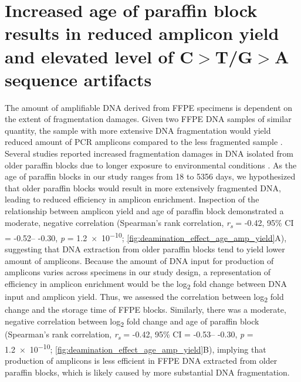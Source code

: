 \newpage
\section{Increased age of paraffin block results in reduced amplicon yield and elevated level of C$>$T/G$>$A sequence artifacts}
\label{sec:IncreasedageofparaffinblockresultsinpoorerampliconyieldandelevatedeventsofC$>$T/G$>$Asequenceartifacts}

The amount of amplifiable DNA derived from FFPE specimens is dependent on the extent of fragmentation damages. Given two FFPE DNA samples of similar quantity, the sample with more extensive DNA fragmentation would yield reduced amount of PCR amplicons compared to the less fragmented sample \cite{Didelot2013, Wong2014}. Several studies reported increased fragmentation damages in DNA isolated from older paraffin blocks due to longer exposure to environmental conditions \cite{Bass2014, Carrick2015, Ludyga2012, Seiler2016}. As the age of paraffin blocks in our study ranges from 18 to 5356 days, we hypothesized that older paraffin blocks would result in more extensively fragmented DNA, leading to reduced efficiency in amplicon enrichment. Inspection of the relationship between amplicon yield and age of paraffin block demonstrated a moderate, negative correlation (Spearman's rank correlation, \textit{r\textsubscript{s}} = -0.42, 95\% CI = -0.52-- -0.30, \textit{p} = \num{1.2e-10}; \autoref{fig:deamination_effect_age_amp_yield}A), suggesting that DNA extraction from older paraffin blocks tend to yield lower amount of amplicons. Because the amount of DNA input for production of amplicons varies across specimens in our study design, a representation of efficiency in amplicon enrichment would be the log\textsubscript{2} fold change between DNA input and amplicon yield. Thus, we assessed the correlation between log\textsubscript{2} fold change and the storage time of FFPE blocks. Similarly, there was a moderate, negative correlation between log\textsubscript{2} fold change and age of paraffin block (Spearman's rank correlation, \textit{r\textsubscript{s}} = -0.42, 95\% CI = -0.53-- -0.30, \textit{p} = \num{1.2e-10}; \autoref{fig:deamination_effect_age_amp_yield}B), implying that production of amplicons is less efficient in FFPE DNA extracted from older paraffin blocks, which is likely caused by more substantial DNA fragmentation.

